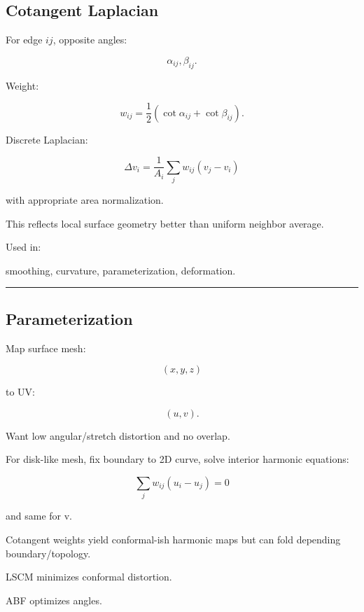 \subsection{Cotangent Laplacian}\label{04-visual-computing-ii-ch041-cotangent-laplacian}

\hypertarget{04-visual-computing-ii-ch041-cotangent-laplacian}{}

For edge \(ij\), opposite angles:

\[
\alpha_{ij},\beta_{ij}.
\]

Weight:

\[
\boxed{
w_{ij}
=
\frac12
(
\cot\alpha_{ij}
+
\cot\beta_{ij}
).
}
\]

Discrete Laplacian:

\[
\Delta v_i
=
\frac1{A_i}
\sum_{j}
w_{ij}(v_j-v_i)
\]

with appropriate area normalization.

This reflects local surface geometry better than uniform neighbor average.

Used in:

smoothing, curvature, parameterization, deformation.

\begin{center}\rule{0.5\linewidth}{0.5pt}\end{center}

\subsection{Parameterization}\label{04-visual-computing-ii-ch041-parameterization}

\hypertarget{04-visual-computing-ii-ch041-parameterization}{}

Map surface mesh:

\[
(x,y,z)
\]

to UV:

\[
(u,v).
\]

Want low angular/stretch distortion and no overlap.

For disk-like mesh, fix boundary to 2D curve, solve interior harmonic equations:

\[
\boxed{
\sum_j
w_{ij}
(u_i-u_j)=0
}
\]

and same for v.

Cotangent weights yield conformal-ish harmonic maps but can fold depending boundary/topology.

LSCM minimizes conformal distortion.

ABF optimizes angles.

